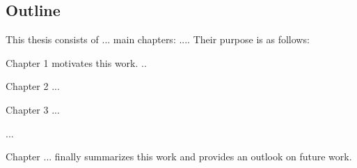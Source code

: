 \subsection{Outline}


This thesis consists of ... main chapters: .... Their purpose is as follows:

Chapter 1 motivates this work.
..

Chapter 2 ...

Chapter 3 ...

...

Chapter ... finally summarizes this work and provides an outlook on future work.


